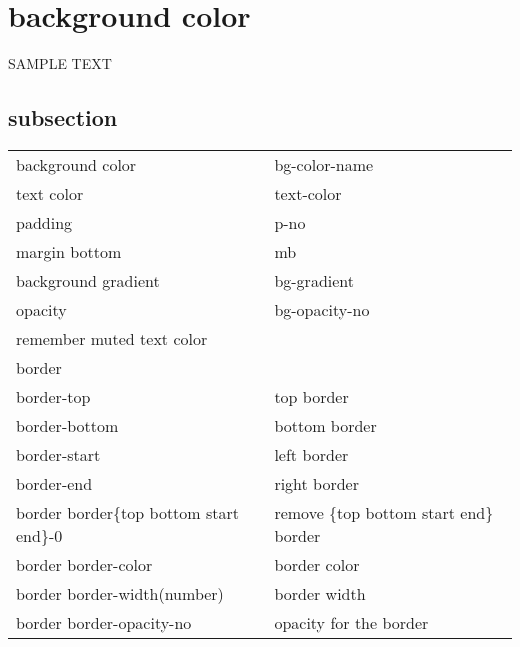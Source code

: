 \documentclass{article}
\begin{document}
	\tableofcontents
	
	\section{background color}
		SAMPLE TEXT
		\subsection{subsection}
		\begin{longtable}{ll}
			\hline
			background color                            & bg-color-name                               \\
			text color                                  & text-color                                  \\
			padding                                     & p-no                                        \\
			margin bottom                               & mb                                          \\
			background gradient                         & bg-gradient                                 \\
			opacity                                     & bg-opacity-no                               \\
			remember muted text color                   &                                             \\ \hline
			border                                      &                                             \\ \hline
			border-top                                  & top border                                  \\
			border-bottom                               & bottom border                               \\
			border-start                                & left border                                 \\
			border-end                                  & right border                                \\
			border border\{top bottom start end\}-0     & remove \{top bottom start end\} border      \\
			border border-color                         & border color                                \\
			border border-width(number)                 & border width                                \\
			border border-opacity-no                    & opacity for the border                      \\

\end{longtable}
\end{document}
